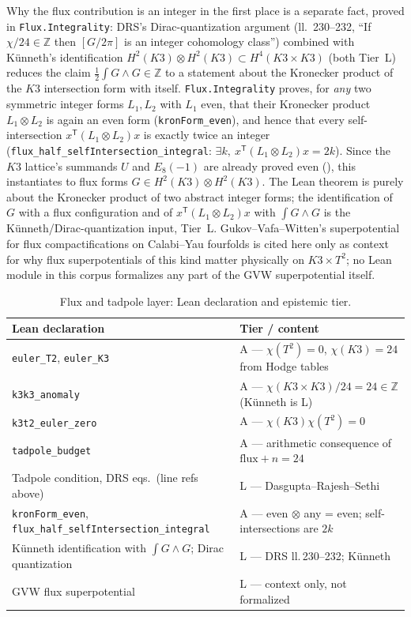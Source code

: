 \documentclass[11pt,a4paper]{article}
\theoremstyle{remark}
\begin{document}
Why the flux contribution is an integer in the first place is a separate fact, proved in
\texttt{Flux.Integrality}: DRS's Dirac-quantization argument (ll.~230--232, ``If $\chi/24\in
\mathbb{Z}$ then $[G/2\pi]$ is an integer cohomology class'') combined with K\"unneth's
identification $H^2(K3)\otimes H^2(K3)\subset H^4(K3\times K3)$ (both Tier~L) reduces the claim
$\tfrac12\int G\wedge G\in\mathbb{Z}$ to a statement about the Kronecker product of the $K3$
intersection form with itself. \texttt{Flux.Integrality} proves, for \emph{any} two symmetric
integer forms $L_1,L_2$ with $L_1$ even, that their Kronecker product $L_1\otimes L_2$ is again an
even form (\texttt{kronForm\_even}), and hence that every self-intersection
$x^{\mathsf T}(L_1\otimes L_2)x$ is exactly twice an integer
(\texttt{flux\_half\_selfIntersection\_integral}: $\exists k,\ x^{\mathsf T}(L_1\otimes L_2)x=2k$).
Since the $K3$ lattice's summands $U$ and $E_8(-1)$ are already proved even
(), this instantiates to flux forms $G\in H^2(K3)\otimes H^2(K3)$. The Lean
theorem is purely about the Kronecker product of two abstract integer forms; the identification of
$G$ with a flux configuration and of $x^{\mathsf T}(L_1\otimes L_2)x$ with $\int G\wedge G$ is the
K\"unneth/Dirac-quantization input, Tier~L. Gukov--Vafa--Witten's superpotential for flux
compactifications on Calabi--Yau fourfolds \cite{GukovVafaWitten1999} is cited here only as
context for why flux superpotentials of this kind matter physically on $K3\times T^2$; no Lean
module in this corpus formalizes any part of the GVW superpotential itself.

\begin{table}[htbp]
\centering\footnotesize
\caption{Flux and tadpole layer: Lean declaration and epistemic tier.}
\label{tab:flux}
\begin{tabular}{@{}l l@{}}
\toprule
\textbf{Lean declaration} & \textbf{Tier / content} \\ \midrule
\texttt{euler\_T2}, \texttt{euler\_K3} & A --- $\chi(T^2)=0$, $\chi(K3)=24$ from Hodge tables \\
\texttt{k3k3\_anomaly} & A --- $\chi(K3\times K3)/24=24\in\mathbb{Z}$ (K\"unneth is L) \\
\texttt{k3t2\_euler\_zero} & A --- $\chi(K3)\chi(T^2)=0$ \\
\texttt{tadpole\_budget} & A --- arithmetic consequence of $\mathrm{flux}+n=24$ \\
Tadpole condition, DRS eqs.\ (line refs above) & L --- Dasgupta--Rajesh--Sethi \\
\texttt{kronForm\_even}, \texttt{flux\_half\_selfIntersection\_integral} & A --- even $\otimes$ any = even; self-intersections are $2k$ \\
Künneth identification with $\int G\wedge G$; Dirac quantization & L --- DRS ll.\,230--232; Künneth \\
GVW flux superpotential & L --- context only, not formalized \\
\bottomrule
\end{tabular}
\end{table}
\end{document}
